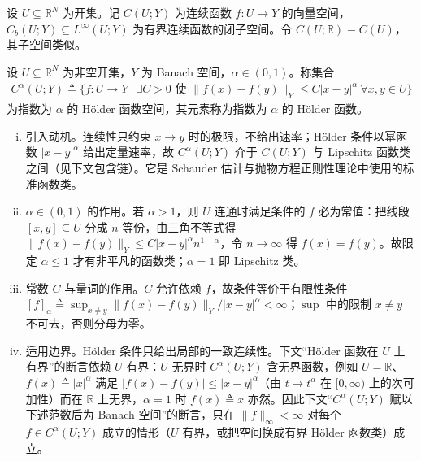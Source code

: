 \documentclass[../../main.tex]{subfiles}%
\begin{document}
设 $U\subseteq\mathbb{R}^N$ 为开集。记 $C(U;Y)$ 为连续函数 $f:U\to Y$ 的向量空间，$C_b(U;Y)\subseteq L^\infty(U;Y)$ 为有界连续函数的闭子空间。令 $C(U;\mathbb{R})\equiv C(U)$，其子空间类似。

\begin{definition}[Hölder 空间]\label{definition:ch04-Holder}
设 $U\subseteq\mathbb{R}^N$ 为非空开集，$Y$ 为 Banach 空间，$\alpha\in(0,1)$。称集合
\begin{align*}
C^\alpha(U;Y)\triangleq \Big\{f:U\to Y\ \Big|\ \exists C>0\text{ 使 }\|f(x)-f(y)\|_Y\leqslant C|x-y|^\alpha\ \forall x,y\in U\Big\}
\end{align*}
为指数为 $\alpha$ 的 Hölder 函数空间，其元素称为指数为 $\alpha$ 的 Hölder 函数。
\end{definition}

\begin{remark}
\begin{enumerate}[(i)]
\item 引入动机。连续性只约束 $x\to y$ 时的极限，不给出速率；Hölder 条件以幂函数 $|x-y|^\alpha$ 给出定量速率，故 $C^\alpha(U;Y)$ 介于 $C(U;Y)$ 与 Lipschitz 函数类之间（见下文包含链）。它是 Schauder 估计与抛物方程正则性理论中使用的标准函数类。

\item $\alpha\in(0,1)$ 的作用。若 $\alpha>1$，则 $U$ 连通时满足条件的 $f$ 必为常值：把线段 $[x,y]\subseteq U$ 分成 $n$ 等份，由三角不等式得 $\|f(x)-f(y)\|_Y\leqslant C|x-y|^\alpha n^{1-\alpha}$，令 $n\to\infty$ 得 $f(x)=f(y)$。故限定 $\alpha\leqslant1$ 才有非平凡的函数类；$\alpha=1$ 即 Lipschitz 类。

\item 常数 $C$ 与量词的作用。$C$ 允许依赖 $f$，故条件等价于有限性条件 $[f]_\alpha\triangleq\sup_{x\neq y}\|f(x)-f(y)\|_Y/|x-y|^\alpha<\infty$；$\sup$ 中的限制 $x\neq y$ 不可去，否则分母为零。

\item 适用边界。Hölder 条件只给出局部的一致连续性。下文“Hölder 函数在 $U$ 上有界”的断言依赖 $U$ 有界：$U$ 无界时 $C^\alpha(U;Y)$ 含无界函数，例如 $U=\mathbb{R}$、$f(x)\triangleq|x|^\alpha$ 满足 $|f(x)-f(y)|\leqslant|x-y|^\alpha$（由 $t\mapsto t^\alpha$ 在 $[0,\infty)$ 上的次可加性）而在 $\mathbb{R}$ 上无界，$\alpha=1$ 时 $f(x)\triangleq x$ 亦然。因此下文“$C^\alpha(U;Y)$ 赋以下述范数后为 Banach 空间”的断言，只在 $\|f\|_\infty<\infty$ 对每个 $f\in C^\alpha(U;Y)$ 成立的情形（$U$ 有界，或把空间换成有界 Hölder 函数类）成立。
\end{enumerate}
\end{remark}
\end{document}
